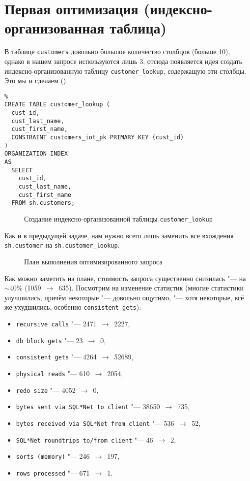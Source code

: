 \section{Первая оптимизация (индексно-организованная таблица)}


В таблице \texttt{customers} довольно большое количество столбцов (больше 10), однако в нашем запросе используются лишь 3, отсюда появляется идея создать индексно-организованную таблицу \texttt{customer\_lookup}, содержащую эти столбцы. Это мы и сделаем ().

\begin{verbatim}%
CREATE TABLE customer_lookup (
  cust_id,
  cust_last_name,
  cust_first_name,
  CONSTRAINT customers_iot_pk PRIMARY KEY (cust_id)
)
ORGANIZATION INDEX
AS
  SELECT
    cust_id,
    cust_last_name,
    cust_first_name
  FROM sh.customers;
\end{verbatim}
\begin{figure}[H]%
  \caption{Создание индексно-организованной таблицы \texttt{customer\_lookup}}
  \label{pekoooooora}
\end{figure}

Как и в предыдущей задаче, нам нужно всего лишь заменить все вхождения \texttt{sh.customer} на \texttt{sh.customer\_lookup}.

\begin{figure}[H]%
  \caption{План выполнения оптимизированного запроса}
  \label{fig-task-4-iot-plan}
\end{figure}

Как можно заметить на плане, стоимость запроса существенно снизилась "--- на $\sim 40$\% (1059~$\to$~635).
Посмотрим на изменение статистик (многие статистики улучшились, причём некоторые "--- довольно ощутимо, "--- хотя некоторые, всё же ухудшились, особенно \texttt{consistent gets}):
\begin{itemize}%
  \item \texttt{recursive calls} "--- 2471~$\to$~2227,
  \item \texttt{db block gets} "--- 23~$\to$~0,
  \item \texttt{consistent gets} "--- 4264~$\to$~52689,
  \item \texttt{physical reads} "--- 610~$\to$~2054,
  \item \texttt{redo size} "--- 4052~$\to$~0,
  \item \texttt{bytes sent via SQL*Net to client} "--- 38650~$\to$~735,
  \item \texttt{bytes received via SQL*Net from client} "--- 536~$\to$~52,
  \item \texttt{SQL*Net roundtrips to/from client} "--- 46~$\to$~2,
  \item \texttt{sorts (memory)} "--- 246~$\to$~197,
  \item \texttt{rows processed} "--- 671~$\to$~1.
\end{itemize}


